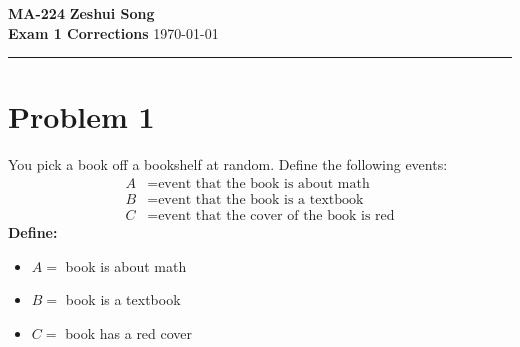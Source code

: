 ﻿\documentclass[12pt]{article}
\begin{document}
\noindent
\textbf{MA-224} \hfill \textbf{Zeshui Song} \\
\textbf{Exam 1 Corrections} \hfill \today
\vspace{2mm}
\hrule
\vspace{6mm}

\section*{Problem 1}
You pick a book off a bookshelf at random. Define the following events:
\begin{align*}
A &= \text{event that the book is about math}\\
B &= \text{event that the book is a textbook}\\
C &= \text{event that the cover of the book is red}
\end{align*}
\textbf{Define:}
\begin{itemize}
    \item $A = $ book is about math
    \item $B = $ book is a textbook
    \item $C = $ book has a red cover 
\end{itemize}
\end{document}

